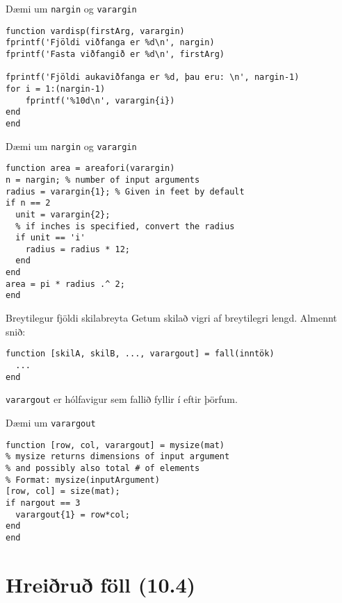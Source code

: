 \documentclass[handout]{beamer}
\begin{document}
\begin{frame}[fragile]{Dæmi um \texttt{nargin} og \texttt{varargin}}
\begin{verbatim}
function vardisp(firstArg, varargin)
fprintf('Fjöldi viðfanga er %d\n', nargin)
fprintf('Fasta viðfangið er %d\n', firstArg)

fprintf('Fjöldi aukaviðfanga er %d, þau eru: \n', nargin-1)
for i = 1:(nargin-1)
    fprintf('%10d\n', varargin{i})
end
end
\end{verbatim}
\end{frame}

\begin{frame}[fragile]{Dæmi um \texttt{nargin} og \texttt{varargin}}
\begin{verbatim}
function area = areafori(varargin)
n = nargin; % number of input arguments
radius = varargin{1}; % Given in feet by default
if n == 2
  unit = varargin{2};
  % if inches is specified, convert the radius
  if unit == 'i'
    radius = radius * 12;
  end
end
area = pi * radius .^ 2;
end
\end{verbatim}

\end{frame}

\begin{frame}[fragile]{Breytilegur fjöldi skilabreyta}
Getum skilað vigri af breytilegri lengd. Almennt snið:
\begin{verbatim}
function [skilA, skilB, ..., varargout] = fall(inntök)
  ...
end
\end{verbatim}
\texttt{varargout} er hólfavigur sem fallið fyllir í eftir þörfum.
\end{frame}

\begin{frame}[fragile]{Dæmi um \texttt{varargout}}
\begin{verbatim}
function [row, col, varargout] = mysize(mat)
% mysize returns dimensions of input argument
% and possibly also total # of elements
% Format: mysize(inputArgument)
[row, col] = size(mat);
if nargout == 3
  varargout{1} = row*col;
end
end
\end{verbatim}

\end{frame}

\section{Hreiðruð föll (10.4)}
\end{document}
